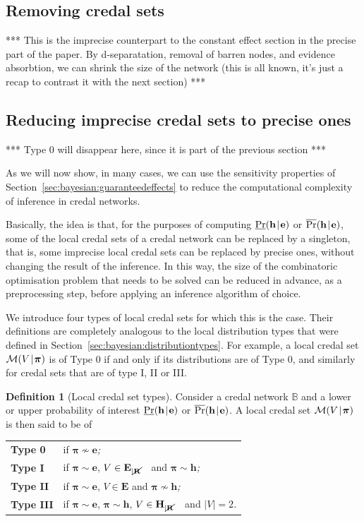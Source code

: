 \documentclass[10pt,a4paper]{paper}
\theoremstyle{definition}
\newtheorem{defi}{Definition}
\newcommand{\vbpi}{\boldsymbol\pi}
\newcommand{\hyp}{\mathbf{h}}
\newcommand{\ev}{\mathbf{e}}
\newcommand{\hyps}{\mathbf{H}}
\newcommand{\evs}{\mathbf{E}}
\newcommand{\restr}{_{|\cancel{\bf R}}}
\newcommand{\credal}{\mathcal{M}}
\newcommand{\newmid}{\hspace{0.9pt}\vert\hspace{0.9pt}}
\begin{document}
\subsection{Removing credal sets}

{\color{red}*** This is the imprecise counterpart to the constant effect section in the precise part of the paper. By d-separatation, removal of barren nodes, and evidence absorbtion, we can shrink the size of the network (this is all known, it's just a recap to contrast it with the next section) ***}

\subsection{Reducing imprecise credal sets to precise ones}\label{sec:credal:reducetosingletons}

{\color{red}  *** Type 0 will disappear here, since it is part of the previous section ***}

As we will now show, in many cases, we can use the sensitivity properties of Section~\ref{sec:bayesian:guaranteedeffects} to reduce the computational complexity of inference in credal networks.

Basically, the idea is that, for the purposes of computing $\underline{\Pr}(\hyp\newmid\ev)$ or $\overline{\Pr}(\hyp\newmid\ev)$, some of the local credal sets of a credal network can be replaced by a singleton, that is, some imprecise local credal sets can be replaced by precise ones, without changing the result of the inference. In this way, the size of the combinatoric optimisation problem that needs to be solved can be reduced in advance, as a preprocessing step, before applying an inference algorithm of choice. 

We introduce four types of local credal sets for which this is the case. Their definitions are completely analogous to the local distribution types that were defined in Section~\ref{sec:bayesian:distributiontypes}. For example, a local credal set $\credal(V\newmid\vbpi)$ is of Type 0 if and only if its distributions are of Type 0, and similarly for credal sets that are of type I, II or III.

\begin{defi}[Local credal set types]\label{def:credaltypes}
Consider a credal network ${\mathbb B}$ and a lower or upper probability of interest $\underline{\Pr}(\hyp\newmid\ev)$ or $\overline{\Pr}(\hyp\newmid\ev)$. A local credal set $\credal(V\newmid \vbpi)$ is then said to be of\\[4pt]
\begin{tabular}{l l}
{\bf Type 0} & if\/ $\vbpi\nsim\ev$\emph{;}\\
{\bf Type I} & if\/ $\vbpi\sim\ev$, $V\in \evs\restr$~~and $\vbpi\sim\hyp$\emph{;}\\
{\bf Type II} & if\/ $\vbpi\sim\ev$, $V\in \evs$ and $\vbpi\nsim\hyp$\emph{;}\\
{\bf Type III} & if\/ $\vbpi\sim\ev$, $\vbpi\sim\hyp$, $V\in \hyps\restr$~~and $\vert V\vert =2$\emph{.}
\end{tabular}
\end{defi}
\end{document}
